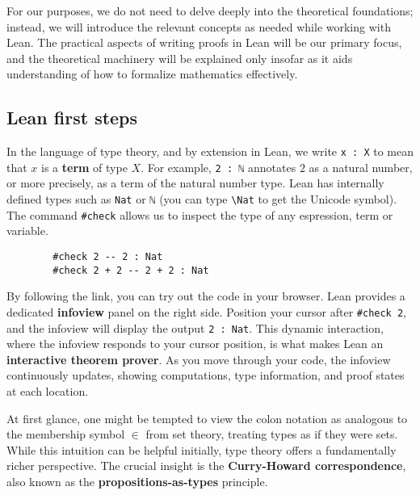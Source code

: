 For our purposes, we do not need to delve deeply into the theoretical foundations; 
instead, we will introduce the relevant concepts as needed while working with Lean. 
The practical aspects of writing proofs in Lean will be our primary focus, 
and the theoretical machinery will be explained only insofar as it aids understanding 
of how to formalize mathematics effectively.
\subsection{Lean first steps}

In the language of type theory, and by extension in Lean, we write \lstinline[language=lean]|x : X| 
to mean that $x$ is a \textbf{term} of type $X$. 
For example, \lstinline[language=lean]|2 : ℕ| annotates $2$ as a natural number, 
or more precisely, as a term of the natural number type. 
Lean has internally defined types such as \lstinline[language=lean]|Nat| or \lstinline[language=lean]|ℕ| 
(you can type \texttt{\textbackslash Nat} to get the Unicode symbol). 
The command \lstinline[language=lean]|#check| allows us to inspect the type of any espression, term or variable.
\begin{example}\mbox{}

    \begin{lstlisting}
        #check 2 -- 2 : Nat
        #check 2 + 2 -- 2 + 2 : Nat
    \end{lstlisting}
By following the link, you can try out the code in your browser.
Lean provides a dedicated \textbf{infoview} panel on the right side. 
Position your cursor after \lstinline[language=lean]|#check 2|, 
and the infoview will display the output \lstinline[language=lean]|2 : Nat|. 
This dynamic interaction, where the infoview responds to your cursor position, is 
what makes Lean an \textbf{interactive theorem prover}. 
As you move through your code, the infoview continuously updates, 
showing computations, type information, and proof states at each location.
\end{example}
At first glance, one might be tempted to view the colon notation as analogous to the membership 
symbol $\in$ from set theory, treating types as if they were sets. 
While this intuition can be helpful initially, type theory offers a fundamentally richer perspective. 
The crucial insight is the \textbf{Curry-Howard correspondence}, 
also known as the \textbf{propositions-as-types} principle. 
